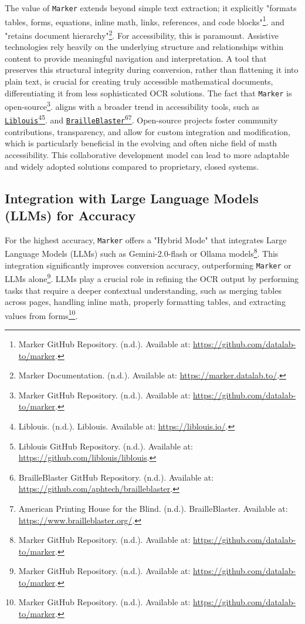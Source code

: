 The value of \texttt{Marker} extends beyond simple text extraction; it explicitly "formats tables, forms, equations, inline math, links, references, and code blocks"\footnote{Marker GitHub Repository. (n.d.). Available at: \url{https://github.com/datalab-to/marker}.}. and "retains document hierarchy"\footnote{Marker Documentation. (n.d.). Available at: \url{https://marker.datalab.to/}.}. For accessibility, this is paramount. Assistive technologies rely heavily on the underlying structure and relationships within content to provide meaningful navigation and interpretation. A tool that preserves this structural integrity during conversion, rather than flattening it into plain text, is crucial for creating truly accessible mathematical documents, differentiating it from less sophisticated OCR solutions. The fact that \texttt{Marker} is open-source\footnote{Marker GitHub Repository. (n.d.). Available at: \url{https://github.com/datalab-to/marker}.}. aligns with a broader trend in accessibility tools, such as \href{https://liblouis.io/}{\texttt{Liblouis}}\footnote{Liblouis. (n.d.). Liblouis. Available at: \url{https://liblouis.io/}.}\footnote{Liblouis GitHub Repository. (n.d.). Available at: \url{https://github.com/liblouis/liblouis}.}. and \href{https://github.com/aphtech/brailleblaster}{\texttt{BrailleBlaster}}\footnote{BrailleBlaster GitHub Repository. (n.d.). Available at: \url{https://github.com/aphtech/brailleblaster}.}\footnote{American Printing House for the Blind. (n.d.). BrailleBlaster. Available at: \url{https://www.brailleblaster.org/}.}. Open-source projects foster community contributions, transparency, and allow for custom integration and modification, which is particularly beneficial in the evolving and often niche field of math accessibility. This collaborative development model can lead to more adaptable and widely adopted solutions compared to proprietary, closed systems.

\subsection{Integration with Large Language Models (LLMs) for Accuracy}
For the highest accuracy, \texttt{Marker} offers a "Hybrid Mode" that integrates Large Language Models (LLMs) such as Gemini-2.0-flash or Ollama models\footnote{Marker GitHub Repository. (n.d.). Available at: \url{https://github.com/datalab-to/marker}.}. This integration significantly improves conversion accuracy, outperforming \texttt{Marker} or LLMs alone\footnote{Marker GitHub Repository. (n.d.). Available at: \url{https://github.com/datalab-to/marker}.}. LLMs play a crucial role in refining the OCR output by performing tasks that require a deeper contextual understanding, such as merging tables across pages, handling inline math, properly formatting tables, and extracting values from forms\footnote{Marker GitHub Repository. (n.d.). Available at: \url{https://github.com/datalab-to/marker}.}.

